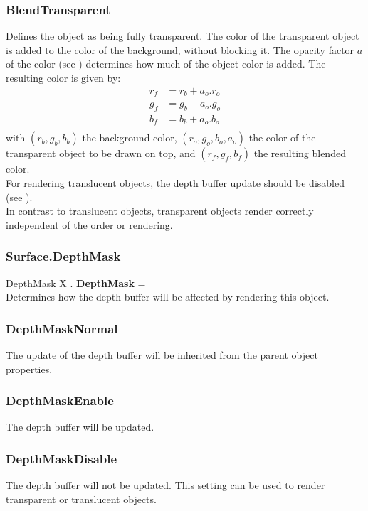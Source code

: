 \subsubsection{BlendTransparent \label{T:BlendType|BlendTransparent}}
Defines the object as being fully transparent. The color of the transparent object is added to the color of the background, without blocking it. The opacity factor $a$ of the color (see ) determines how much of the object color is added. The resulting color is given by:
\begin{equation}
\begin{array}{rcl}
r_f & = r_b + a_o . r_o \\
g_f & = g_b + a_o . g_o \\
b_f & = b_b + a_o . b_o \\
\end{array}
\end{equation}
with $(r_b,g_b,b_b)$ the background color, $(r_o,g_o,b_o,a_o)$ the color of the transparent object to be drawn on top, and $(r_f,g_f,b_f)$ the resulting blended color. \\
For rendering translucent objects, the depth buffer update should be disabled (see ). \\
In contrast to translucent objects, transparent objects render correctly independent of the order or rendering.

\subsubsection{Surface.DepthMask \label{F:Surface:DepthMask}}
DepthMask X . \textbf{DepthMask} = \\
Determines how the depth buffer will be affected by rendering this object.

\subsubsection{DepthMaskNormal \label{T:DepthMask|DepthMaskNormal}}
The update of the depth buffer will be inherited from the parent object properties.

\subsubsection{DepthMaskEnable \label{T:DepthMask|DepthMaskEnable}}
The depth buffer will be updated.

\subsubsection{DepthMaskDisable \label{T:DepthMask|DepthMaskDisable}}
The depth buffer will not be updated. This setting can be used to render transparent or translucent objects.

